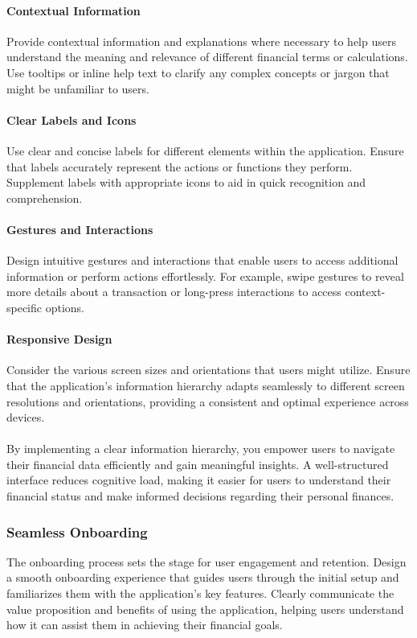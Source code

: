 \paragraph{Contextual Information}
Provide contextual information and explanations where necessary to help users understand the 
meaning and relevance of different financial terms or calculations. Use tooltips or inline help text to clarify any 
complex concepts or jargon that might be unfamiliar to users.

\paragraph{Clear Labels and Icons}
Use clear and concise labels for different elements within the application. Ensure 
that labels accurately represent the actions or functions they perform. Supplement labels with appropriate icons 
to aid in quick recognition and comprehension.

\paragraph{Gestures and Interactions}
Design intuitive gestures and interactions that enable users to access additional 
information or perform actions effortlessly. For example, swipe gestures to reveal more details about a transaction 
or long-press interactions to access context-specific options.

\paragraph{Responsive Design}
Consider the various screen sizes and orientations that users might utilize. Ensure that the 
application's information hierarchy adapts seamlessly to different screen resolutions and orientations, providing a 
consistent and optimal experience across devices.
\\
\\
By implementing a clear information hierarchy, you empower users to navigate their financial data efficiently and gain 
meaningful insights. A well-structured interface reduces cognitive load, making it easier for users to understand 
their financial status and make informed decisions regarding their personal finances.


\subsubsection{Seamless Onboarding}
The onboarding process sets the stage for user engagement and retention. Design a smooth onboarding experience that 
guides users through the initial setup and familiarizes them with the application's key features. Clearly communicate 
the value proposition and benefits of using the application, helping users understand how it can assist them in 
achieving their financial goals.

